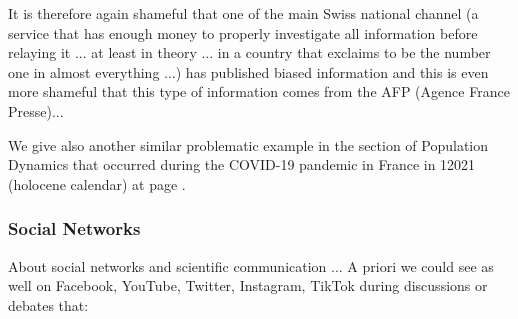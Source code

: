 	It is therefore again shameful that one of the main Swiss national channel (a service that has enough money to properly investigate all information before relaying it ... at least in theory ... in a country that exclaims to be the number one in almost everything ...) has published biased information and this is even more shameful that this type of information comes from the AFP (Agence France Presse)...
	
	We give also another similar problematic example in the section of Population Dynamics that occurred during the COVID-19 pandemic in France in 12021 (holocene calendar) at page \pageref{cnews fallacy}.
	
	\subsubsection{Social Networks}
	About social networks and scientific communication ... A priori we could see as well on Facebook, YouTube, Twitter, Instagram, TikTok during discussions or debates that:
